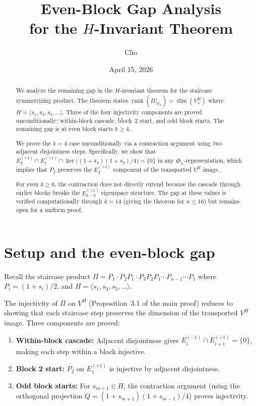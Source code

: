 \documentclass[11pt]{article}
\title{Even-Block Gap Analysis\\for the $H$-Invariant Theorem}
\author{Clio}
\date{April 15, 2026}
\theoremstyle{definition}
\theoremstyle{remark}
\newcommand{\Sym}{\mathfrak{S}}
\newcommand{\rk}{\operatorname{rank}}
\begin{document}
\maketitle

\begin{abstract}
We analyze the remaining gap in the $H$-invariant theorem for the
staircase symmetrizing product. The theorem states
$\rk(\Pi|_{V_\lambda}) = \dim(V_\lambda^H)$ where
$H = \langle s_1, s_3, s_5, \ldots \rangle$. Three of the four
injectivity components are proved unconditionally: within-block
cascade, block~$2$ start, and odd block starts. The remaining gap
is at even block starts $k \ge 4$.

We prove the $k = 4$ case unconditionally via a contraction argument
using two adjacent disjointness steps. Specifically, we show that
$E_3^{(+1)} \cap E_1^{(+1)} \cap \ker\bigl((1{+}s_4)(1{+}s_2)/4\bigr) = \{0\}$
in any $\Sym_n$-representation, which implies that $P_2$ preserves
the $E_4^{(+1)}$ component of the transported $V^H$ image.

For even $k \ge 6$, the contraction does not directly extend because
the cascade through earlier blocks breaks the $E_{k-3}^{(+1)}$
eigenspace structure. The gap at these values is verified
computationally through $k = 14$ (giving the theorem for $n \le 16$)
but remains open for a uniform proof.
\end{abstract}


\section{Setup and the even-block gap}

Recall the staircase product
$\Pi = P_1 \cdot P_2 P_1 \cdot P_3 P_2 P_1 \cdots P_{n-1} \cdots P_1$
where $P_i = (1 + s_i)/2$, and $H = \langle s_1, s_3, s_5, \ldots \rangle$.

The injectivity of $\Pi$ on $V^H$ (Proposition~3.1 of the main proof)
reduces to showing that each staircase step preserves the dimension of
the transported $V^H$ image. Three components are proved:
\begin{enumerate}
\item \textbf{Within-block cascade:} Adjacent disjointness gives
  $E_i^{(-1)} \cap E_{i+1}^{(+1)} = \{0\}$, making each step within
  a block injective.
\item \textbf{Block 2 start:} $P_2$ on $E_1^{(+1)}$ is injective by
  adjacent disjointness.
\item \textbf{Odd block starts:} For $s_{m+1} \in H$, the contraction
  argument (using the orthogonal projection
  $Q = (1{+}s_{m+1})(1{+}s_{m-1})/4$) proves injectivity.
\end{enumerate}
\end{document}
